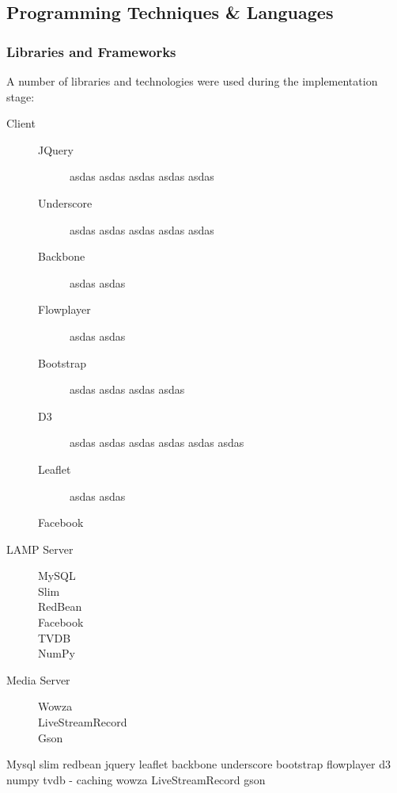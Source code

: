 \subsection{Programming Techniques \& Languages}

\subsubsection{Libraries and Frameworks}

A number of libraries and technologies were used during the implementation stage:

\begin{description}
	\item[Client] \hfill
		\begin{description}
			\item[JQuery] asdas asdas asdas asdas asdas 
			\item[Underscore] asdas asdas asdas asdas asdas 
			\item[Backbone] asdas asdas 
			\item[Flowplayer] asdas asdas 
			\item[Bootstrap] asdas asdas asdas asdas 
			\item[D3] asdas asdas asdas asdas asdas asdas 
			\item[Leaflet] asdas asdas 
			\item[Facebook]
		\end{description}
	\item[LAMP Server] \hfill
		\begin{description}
			\item[MySQL]
			\item[Slim]
			\item[RedBean]
			\item[Facebook]
			\item[TVDB]
			\item[NumPy]
		\end{description}
	\item[Media Server] \hfill
		\begin{description}
			\item[Wowza]
			\item[LiveStreamRecord]
			\item[Gson]
		\end{description}
\end{description}

Mysql
slim
redbean
jquery
leaflet
backbone
underscore
bootstrap
flowplayer
d3
numpy
tvdb - caching
wowza
LiveStreamRecord
gson




